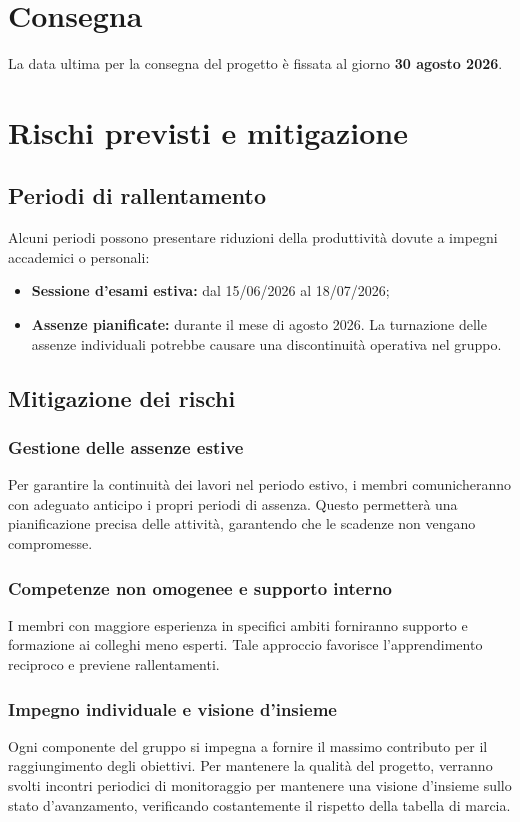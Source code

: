 \documentclass[a4paper, 10pt, colorlinks=true, linkcolor=black, urlcolor=blue, citecolor=blue, hidelinks]{article}
\begin{document}
\section{Consegna}
La data ultima per la consegna del progetto è fissata al giorno \textbf{30 agosto 2026}.

\section{Rischi previsti e mitigazione}

\subsection{Periodi di rallentamento}
Alcuni periodi possono presentare riduzioni della produttività dovute a impegni accademici o personali:
\begin{itemize}
    \item \textbf{Sessione d'esami estiva:} dal 15/06/2026 al 18/07/2026;
    \item \textbf{Assenze pianificate:} durante il mese di agosto 2026. La turnazione delle assenze individuali potrebbe causare una discontinuità operativa nel gruppo.
\end{itemize}

\subsection{Mitigazione dei rischi}

\subsubsection{Gestione delle assenze estive}
Per garantire la continuità dei lavori nel periodo estivo, i membri comunicheranno con adeguato anticipo i propri periodi di assenza. Questo permetterà una pianificazione precisa delle attività, garantendo che le scadenze non vengano compromesse.

\subsubsection{Competenze non omogenee e supporto interno}
I membri con maggiore esperienza in specifici ambiti forniranno supporto e formazione ai colleghi meno esperti. Tale approccio favorisce l'apprendimento reciproco e previene rallentamenti.

\subsubsection{Impegno individuale e visione d'insieme}
Ogni componente del gruppo si impegna a fornire il massimo contributo per il raggiungimento degli obiettivi. Per mantenere la qualità del progetto, verranno svolti incontri periodici di monitoraggio per mantenere una visione d'insieme sullo stato d'avanzamento, verificando costantemente il rispetto della tabella di marcia.
\end{document}
